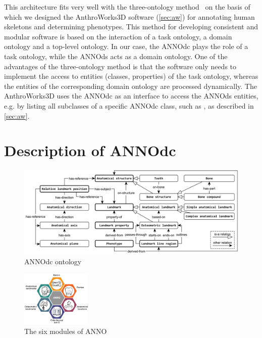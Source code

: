 \documentclass[sw]{iosart2x}
\newcommand{\aw}{AnthroWorks3D}
\begin{document}
This architecture fits very well with the three-ontology method~\citep{threeontologymethod} on the basis of which we designed 
the \aw{} software (\cref{sec:aw}) for annotating human skeletons and determining phenotypes.
This method for developing consistent and modular software is based on the interaction of a task ontology, a domain ontology 
and a top-level ontology. In our case, the ANNOdc plays the role of a task ontology, while the ANNOds acts as a domain ontology. 
One of the advantages of the three-ontology method is that the software only needs to implement the access to entities (classes, properties) 
of the task ontology, whereas the entities of the corresponding domain ontology are processed dynamically. 
The \aw{} uses the ANNOdc as an interface to access the ANNOds entities, e.g. by listing all subclasses of a specific ANNOdc class, 
such as , as described in \cref{sec:aw}.



\section{Description of ANNOdc}\label{sec:core}
\begin{figure}[h]
\includegraphics[width=\textwidth]{img/core.pdf}
\caption{ANNOdc ontology}\label{fig:core}
\end{figure}

\begin{figure}[h]
\includegraphics[width=0.3\textwidth]{img/modules.pdf}
\caption{The six modules of ANNO}\label{fig:modules}
\end{figure}
\end{document}
